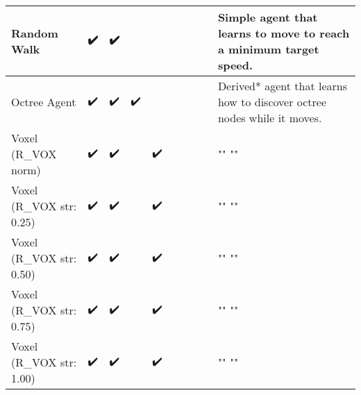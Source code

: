 {\begin{landscape}
\begin{table}[]
{\begin{tabular}{l|cccccccc|l}
            \multicolumn{1}{|l|}{Random Walk} & \multicolumn{1}{c|}{✔️} & \multicolumn{1}{c|}{✔️} & \multicolumn{1}{c|}{} & \multicolumn{1}{c|}{} & \multicolumn{1}{c|}{} & \multicolumn{1}{c|}{} & \multicolumn{1}{c|}{} &  & \multicolumn{1}{l|}{Simple agent that learns to move to reach a minimum target speed.} \\ \hline
            \multicolumn{1}{|l|}{Octree Agent} & \multicolumn{1}{c|}{✔️} & \multicolumn{1}{c|}{✔️} & \multicolumn{1}{c|}{✔️} & \multicolumn{1}{c|}{} & \multicolumn{1}{c|}{} & \multicolumn{1}{c|}{} & \multicolumn{1}{c|}{} &  & \multicolumn{1}{l|}{Derived* agent that learns how to discover octree nodes while it moves.} \\ \hline
            \multicolumn{1}{|l|}{Voxel (R\_VOX norm)} & \multicolumn{1}{c|}{✔️} & \multicolumn{1}{c|}{✔️} & \multicolumn{1}{c|}{} & \multicolumn{1}{c|}{✔️} & \multicolumn{1}{c|}{} & \multicolumn{1}{c|}{} & \multicolumn{1}{c|}{} &  & \multicolumn{1}{l|}{""                                                                                             ""} \\ \hline
            \multicolumn{1}{|l|}{Voxel (R\_VOX str: 0.25)} & \multicolumn{1}{c|}{✔️} & \multicolumn{1}{c|}{✔️} & \multicolumn{1}{c|}{} & \multicolumn{1}{c|}{✔️} & \multicolumn{1}{c|}{} & \multicolumn{1}{c|}{} & \multicolumn{1}{c|}{} &  & \multicolumn{1}{l|}{""                                                                                             ""} \\ \hline
            \multicolumn{1}{|l|}{Voxel (R\_VOX str: 0.50)} & \multicolumn{1}{c|}{✔️} & \multicolumn{1}{c|}{✔️} & \multicolumn{1}{c|}{} & \multicolumn{1}{c|}{✔️} & \multicolumn{1}{c|}{} & \multicolumn{1}{c|}{} & \multicolumn{1}{c|}{} &  & \multicolumn{1}{l|}{""                                                                                             ""} \\ \hline
            \multicolumn{1}{|l|}{Voxel (R\_VOX str: 0.75)} & \multicolumn{1}{c|}{✔️} & \multicolumn{1}{c|}{✔️} & \multicolumn{1}{c|}{} & \multicolumn{1}{c|}{✔️} & \multicolumn{1}{c|}{} & \multicolumn{1}{c|}{} & \multicolumn{1}{c|}{} &  & \multicolumn{1}{l|}{""                                                                                             ""} \\ \hline
            \multicolumn{1}{|l|}{Voxel (R\_VOX str: 1.00)} & \multicolumn{1}{c|}{✔️} & \multicolumn{1}{c|}{✔️} & \multicolumn{1}{c|}{} & \multicolumn{1}{c|}{✔️} & \multicolumn{1}{c|}{} & \multicolumn{1}{c|}{} & \multicolumn{1}{c|}{} &  & \multicolumn{1}{l|}{""                                                                                             ""} \\ \hline

\end{tabular}}
\end{table}
\end{landscape}}
